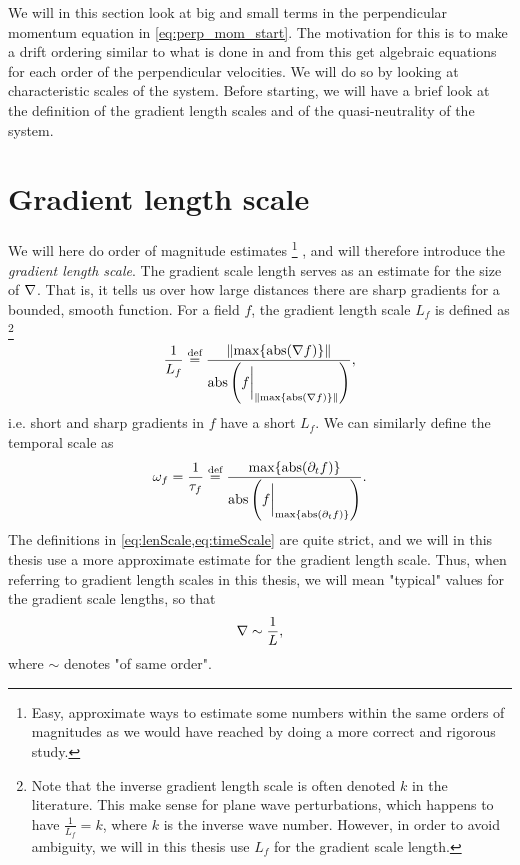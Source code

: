 We will in this section look at big and small terms in the perpendicular momentum equation in \cref{eq:perp_mom_start}.
The motivation for this is to make a drift ordering similar to what is done in \cite{Fitzpatrick2014book} and from this get algebraic equations for each order of the perpendicular velocities.
We will do so by looking at characteristic scales of the system.
Before starting, we will have a brief look at the definition of the gradient length scales and of the quasi-neutrality of the system.

\section{Gradient length scale}
We will here do order of magnitude estimates%
\footnote{
    Easy, approximate ways to estimate some numbers within the same orders of magnitudes as we would have reached by doing a more correct and rigorous study.
}%
, and will therefore introduce the \emph{gradient length scale}.
The gradient scale length serves as an estimate for the size of $\nabla$.
That is, it tells us over how large distances there are sharp gradients for a bounded, smooth function.
For a field $f$, the gradient length scale $L_f$ is defined as%
\footnote{
    Note that the inverse gradient length scale is often denoted $k$ in the literature.
    This make sense for plane wave perturbations, which happens to have $\frac{1}{L_f}=k$, where $k$ is the inverse wave number.
    However, in order to avoid ambiguity, we will in this thesis use $L_f$ for the gradient scale length.
}%
%
\begin{align}
    \frac{1}{L_f} \overset{\text{def}}{=} \frac{\|\text{max}\{\operatorname{abs}(\nabla f)\}\|}{\operatorname{abs}\left(f\bigg|_{\|\text{max}\{\operatorname{abs}(\nabla f)\}\|}\right)},
    \label{eq:lenScale}
\end{align}
%
i.e. short and sharp gradients in $f$ have a short $L_f$.
We can similarly define the temporal scale as
%
\begin{align}
    \omega_f = \frac{1}{\tau_f} \overset{\text{def}}{=} \frac{\text{max}\{\operatorname{abs}(\partial_t f)\}}{\operatorname{abs}\left(f\bigg|_{\text{max}\{\operatorname{abs}(\partial_t f)\}}\right)}.
    \label{eq:timeScale}
\end{align}
%
The definitions in \cref{eq:lenScale,eq:timeScale} are quite strict, and we will in this thesis use a more approximate estimate for the gradient length scale.
Thus, when referring to gradient length scales in this thesis, we will mean "typical" values for the gradient scale lengths, so that
%
\begin{align*}
    \nabla \sim \frac{1}{L},
\end{align*}
%
where $\sim$ denotes "of same order".

